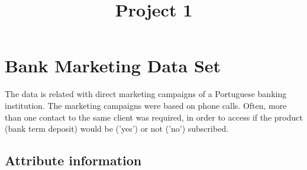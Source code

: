 \documentclass[11pt]{article}
\title{Project 1}
\begin{document}
    
    
    \maketitle
    
    

    
    \section{Bank Marketing Data Set}\label{bank-marketing-data-set}

The data is related with direct marketing campaigns of a Portuguese
banking institution. The marketing campaigns were based on phone calls.
Often, more than one contact to the same client was required, in order
to access if the product (bank term deposit) would be ('yes') or not
('no') subscribed.

    \subsection{Attribute information}\label{attribute-information}
\end{document}
